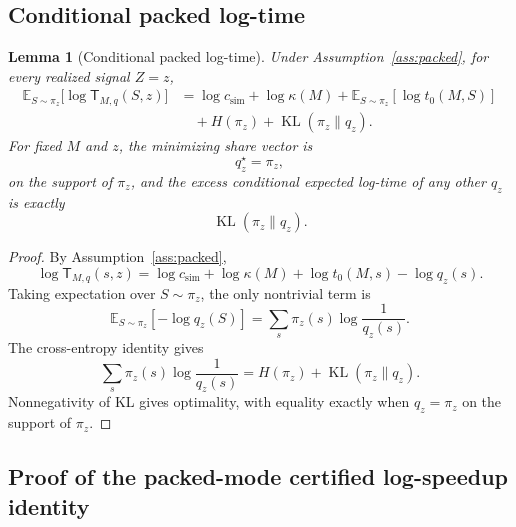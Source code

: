 \documentclass{article}
\newtheorem{lemma}{Lemma}
\DeclareMathOperator{\KL}{KL}
\newcommand{\E}{\mathbb{E}}
\begin{document}
\subsection{Conditional packed log-time}

\begin{lemma}[Conditional packed log-time]
\label{lem:app-conditional-packed}
Under Assumption~\ref{ass:packed}, for every realized signal \(Z=z\),
\[
\begin{aligned}
    \E_{S\sim\pi_z}
    \bigl[
        \log \mathsf T_{M,q}(S,z)
    \bigr]
    &=
    \log c_{\mathrm{sim}}
    +
    \log\kappa(M)
    +
    \E_{S\sim\pi_z}[\log t_0(M,S)]
    \\
    &\quad
    +
    H(\pi_z)
    +
    \KL(\pi_z\|q_z).
\end{aligned}
\]
For fixed \(M\) and \(z\), the minimizing share vector is
\[
    q_z^\star=\pi_z,
\]
on the support of \(\pi_z\), and the excess conditional expected log-time of any other
\(q_z\) is exactly
\[
    \KL(\pi_z\|q_z).
\]
\end{lemma}

\begin{proof}
By Assumption~\ref{ass:packed},
\[
    \log \mathsf T_{M,q}(s,z)
    =
    \log c_{\mathrm{sim}}
    +
    \log\kappa(M)
    +
    \log t_0(M,s)
    -
    \log q_z(s).
\]
Taking expectation over \(S\sim\pi_z\), the only nontrivial term is
\[
    \E_{S\sim\pi_z}[-\log q_z(S)]
    =
    \sum_s \pi_z(s)\log\frac{1}{q_z(s)}.
\]
The cross-entropy identity gives
\[
    \sum_s \pi_z(s)\log\frac{1}{q_z(s)}
    =
    H(\pi_z)+\KL(\pi_z\|q_z).
\]
Nonnegativity of KL gives optimality, with equality exactly when \(q_z=\pi_z\) on the
support of \(\pi_z\).
\end{proof}

\subsection{Proof of the packed-mode certified log-speedup identity}
\end{document}
